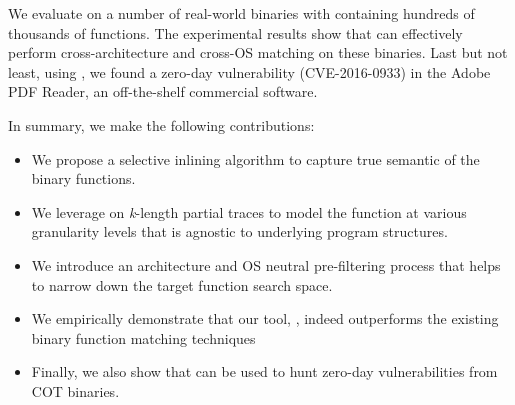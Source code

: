 
We evaluate \tool on a number of real-world binaries with containing hundreds of thousands of functions.
The experimental results show that \tool can effectively perform cross-architecture and cross-OS matching on these binaries.  
Last but not least, using \tool, we found a zero-day vulnerability (CVE-2016-0933) in the Adobe PDF Reader, an off-the-shelf commercial software.

In summary, we make the following contributions:
\begin{itemize} 
\itemsep0em 
\item We propose a selective inlining algorithm to capture true semantic of the binary functions.
\item We leverage on \emph{k}-length partial traces to model the function at various granularity levels that is agnostic to underlying program structures.
\item We introduce an architecture and OS neutral pre-filtering process that helps to narrow down the target function search space.
\item We empirically demonstrate that our tool, \tool, indeed outperforms the existing binary function matching techniques
\item Finally, we also show that \tool can be used to hunt zero-day vulnerabilities from COT binaries.
\end{itemize}



